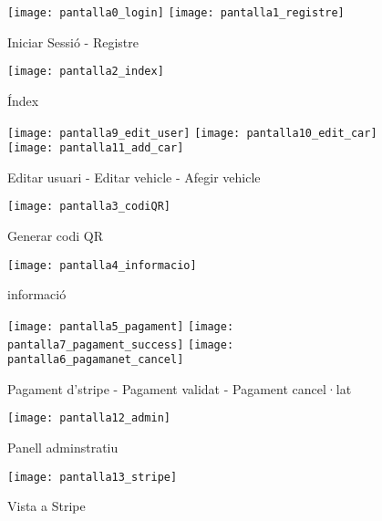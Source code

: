 \begin{slide}
        \begin{figure}[H]
        \centering
        \texttt{[image: pantalla0\_login]}
        \texttt{[image: pantalla1\_registre]}
        \caption{Iniciar Sessió - Registre}
        \end{figure}
\end{slide}
\begin{slide}
        \begin{figure}[H]
        \centering
        \texttt{[image: pantalla2\_index]}
        \caption{Índex}
    \end{figure}
\end{slide}
\begin{slide}
        \begin{figure}[H]
        \centering
        \texttt{[image: pantalla9\_edit\_user]}
        \texttt{[image: pantalla10\_edit\_car]}
        \texttt{[image: pantalla11\_add\_car]}
        \caption{Editar usuari - Editar vehicle - Afegir vehicle}
        \end{figure}
\end{slide}
\begin{slide}
    \begin{figure}[H]
    \centering
    \texttt{[image: pantalla3\_codiQR]}
    \caption{Generar codi QR}
\end{figure}
\end{slide}
\begin{slide}
    \begin{figure}[H]
    \centering
    \texttt{[image: pantalla4\_informacio]}
    \caption{informació}
\end{figure}
\end{slide}
\begin{slide}
    \begin{figure}[H]
    \centering
    \texttt{[image: pantalla5\_pagament]}
    \texttt{[image: pantalla7\_pagament\_success]}
    \texttt{[image: pantalla6\_pagamanet\_cancel]}
    \caption{Pagament d'stripe - Pagament validat - Pagament cancel·lat}
\end{figure}
\end{slide}
\begin{slide}
    \begin{figure}[H]
    \centering
    \texttt{[image: pantalla12\_admin]}
    \caption{Panell adminstratiu}
\end{figure}
\end{slide}
\begin{slide}
    \begin{figure}[H]
    \centering
    \texttt{[image: pantalla13\_stripe]}
    \caption{Vista a Stripe}
\end{figure}
\end{slide}
